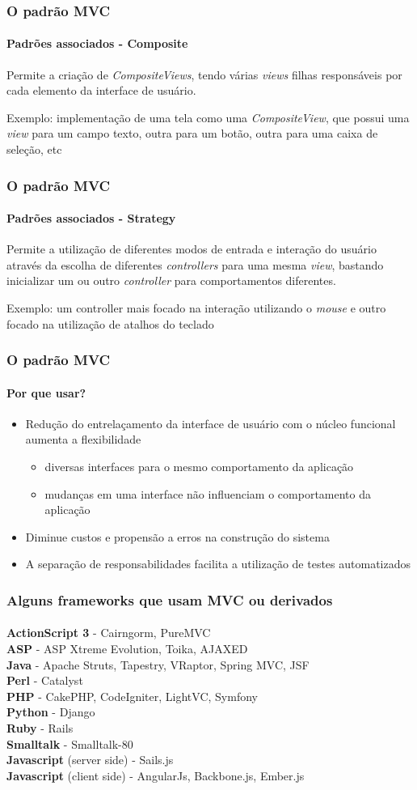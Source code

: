 \documentclass{beamer}
\begin{document}
\begin{frame}
\frametitle{O padrão MVC}
\framesubtitle{Padrões associados - Composite}
  Permite a criação de \textit{CompositeViews}, tendo várias \textit{views} filhas responsáveis por cada elemento da interface de usuário.
  
  Exemplo: implementação de uma tela como uma \textit{CompositeView}, que possui uma \textit{view} para um campo texto, outra para um botão, outra para uma caixa de seleção, etc
\end{frame}

\begin{frame}
\frametitle{O padrão MVC}
\framesubtitle{Padrões associados - Strategy}
	Permite a utilização de diferentes modos de entrada e interação do usuário através da escolha de diferentes \textit{controllers} para uma mesma \textit{view}, bastando inicializar um ou outro \textit{controller} para comportamentos diferentes. 
  
  Exemplo: um controller mais focado na interação utilizando o \textit{mouse} e outro focado na utilização de atalhos do teclado
\end{frame}

\begin{frame}
\frametitle{O padrão MVC}
\framesubtitle{Por que usar?}
\begin{itemize}
	\item Redução do entrelaçamento da interface de usuário com o núcleo funcional aumenta a flexibilidade
\begin{itemize}
  \item diversas interfaces para o mesmo comportamento da aplicação
  \item mudanças em uma interface não influenciam o comportamento da aplicação
\end{itemize}
	\item Diminue custos e propensão a erros na construção do sistema
	\item A separação de responsabilidades facilita a utilização de testes automatizados
\end{itemize}
\end{frame}


\begin{frame}
\frametitle{Alguns frameworks que usam MVC ou derivados}
\framesubtitle{}
	\textbf{ActionScript 3} - Cairngorm, PureMVC\\
	\textbf{ASP} - ASP Xtreme Evolution, Toika, AJAXED\\
	\textbf{Java} - Apache Struts, Tapestry, VRaptor, Spring MVC, JSF\\
	\textbf{Perl} - Catalyst\\
	\textbf{PHP} - CakePHP, CodeIgniter, LightVC, Symfony\\
	\textbf{Python} - Django\\
	\textbf{Ruby} - Rails\\
	\textbf{Smalltalk} - Smalltalk-80\\
	\textbf{Javascript} (server side) - Sails.js\\
	\textbf{Javascript} (client side) - AngularJs, Backbone.js, Ember.js\\
\end{frame}
\end{document}
